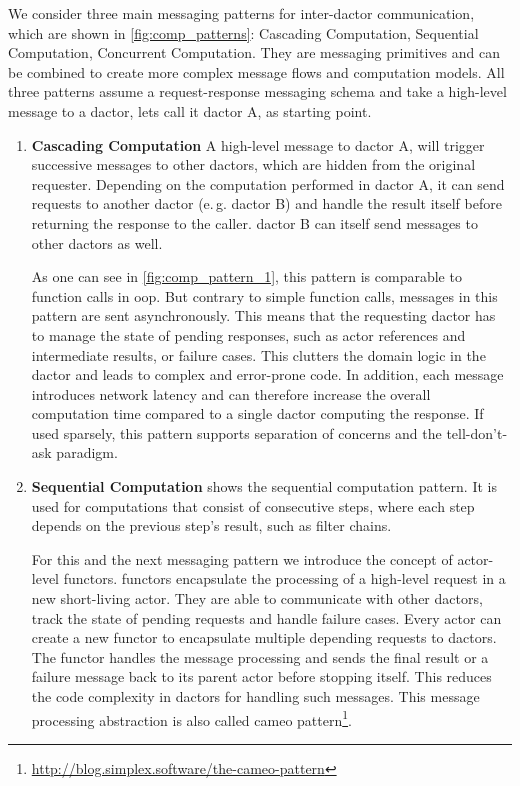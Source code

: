     We consider three main messaging patterns for inter-\gls{dactor} communication, which are shown in \cref{fig:comp_patterns}: Cascading Computation, Sequential Computation, Concurrent Computation.
    They are messaging primitives and can be combined to create more complex message flows and computation models.
    All three patterns assume a request-response messaging schema and take a high-level message to a \gls{dactor}, lets call it \gls{dactor} A, as starting point.

    \begin{enumerate}
      \item\label{enum:comp_pattern_1} \textbf{Cascading Computation}
        A high-level message to \gls{dactor} A, will trigger successive messages to other \glspl{dactor}, which are hidden from the original requester.
        Depending on the computation performed in \gls{dactor} A, it can send requests to another \gls{dactor} (e.\,g. \gls{dactor} B) and handle the result itself before returning the response to the caller.
        \Gls{dactor} B can itself send messages to other \glspl{dactor} as well.
        
        As one can see in \cref{fig:comp_pattern_1}, this pattern is comparable to function calls in \gls{oop}.
        But contrary to simple function calls, messages in this pattern are sent asynchronously.
        This means that the requesting \gls{dactor} has to manage the state of pending responses, such as actor references and intermediate results, or failure cases.
        This clutters the domain logic in the \gls{dactor} and leads to complex and error-prone code.
        In addition, each message introduces network latency and can therefore increase the overall computation time compared to a single \gls{dactor} computing the response.
        If used sparsely, this pattern supports separation of concerns and the tell-don't-ask paradigm.

      \item\label{enum:comp_pattern_2} \textbf{Sequential Computation}
         shows the sequential computation pattern.
        It is used for computations that consist of consecutive steps, where each step depends on the previous step's result, such as filter chains.

        For this and the next messaging pattern we introduce the concept of actor-level \glspl{functor}.
        \Glspl{functor} encapsulate the processing of a high-level request in a new short-living actor.
        They are able to communicate with other \glspl{dactor}, track the state of pending requests and handle failure cases.
        Every actor can create a new \gls{functor} to encapsulate multiple depending requests to \glspl{dactor}.
        The \gls{functor} handles the message processing and sends the final result or a failure message back to its parent actor before stopping itself.
        This reduces the code complexity in \glspl{dactor} for handling such messages.
        This message processing abstraction is also called cameo pattern\footnote{\url{http://blog.simplex.software/the-cameo-pattern}}.


\end{enumerate}
